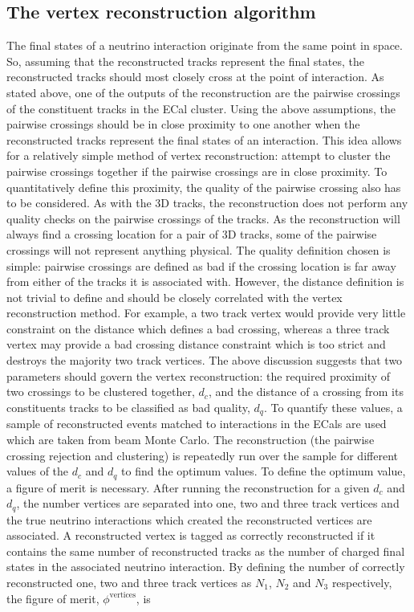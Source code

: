 \subsection{The vertex reconstruction algorithm}
\label{subsec:VertexReconstructionAlgorithm}
The final states of a neutrino interaction originate from the same point in space.  So, assuming that the reconstructed tracks represent the final states, the reconstructed tracks should most closely cross at the point of interaction.  As stated above, one of the outputs of the reconstruction are the pairwise crossings of the constituent tracks in the ECal cluster.  Using the above assumptions,  the pairwise crossings should be in close proximity to one another when the reconstructed tracks represent the final states of an interaction.  This idea allows for a relatively simple method of vertex reconstruction: attempt to cluster the pairwise crossings together if the pairwise crossings are in close proximity.  To quantitatively define this proximity, the quality of the pairwise crossing also has to be considered.
\newline 
\newline
As with the 3D tracks, the reconstruction does not perform any quality checks on the pairwise crossings of the tracks.  As the reconstruction will always find a crossing location for a pair of 3D tracks, some of the pairwise crossings will not represent anything physical.  The quality definition chosen is simple: pairwise crossings are defined as bad if the crossing location is far away from either of the tracks it is associated with.  However, the distance definition is not trivial to define and should be closely correlated with the vertex reconstruction method.  For example, a two track vertex would provide very little constraint on the distance which defines a bad crossing, whereas a three track vertex may provide a bad crossing distance constraint which is too strict and destroys the majority two track vertices. 
\newline
\newline
The above discussion suggests that two parameters should govern the vertex reconstruction: the required proximity of two crossings to be clustered together, $d_c$, and the distance of a crossing from its constituents tracks to be classified as bad quality, $d_q$.  To quantify these values, a sample of reconstructed events matched to interactions in the ECals are used which are taken from beam Monte Carlo.  The reconstruction (the pairwise crossing rejection and clustering) is repeatedly run over the sample for different values of the $d_c$ and $d_q$ to find the optimum values.  To define the optimum value, a figure of merit is necessary.  After running the reconstruction for a given $d_c$ and $d_q$, the number vertices are separated into one, two and three track vertices and the true neutrino interactions which created the reconstructed vertices are associated.  A reconstructed vertex is tagged as correctly reconstructed if it contains the same number of reconstructed tracks as the number of charged final states in the associated neutrino interaction.  By defining the number of correctly reconstructed one, two and three track vertices as $N_1$, $N_2$ and $N_3$ respectively, the figure of merit, $\phi^{\textrm{vertices}}$, is
